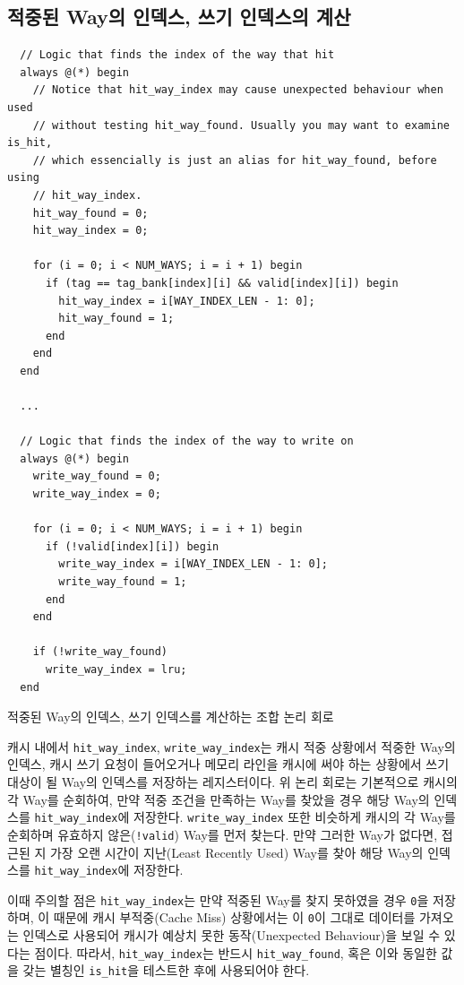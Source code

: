 \documentclass[openright, a4paper]{article}
\newcommand{\code}[1]{\texttt{#1}}
\newenvironment{longlisting}{\captionsetup{type=listing}}{}
\begin{document}
\subsection{적중된 Way의 인덱스, 쓰기 인덱스의 계산}

\hfill

\begin{longlisting}
    \begin{verbatim}
  // Logic that finds the index of the way that hit
  always @(*) begin
    // Notice that hit_way_index may cause unexpected behaviour when used
    // without testing hit_way_found. Usually you may want to examine is_hit,
    // which essencially is just an alias for hit_way_found, before using
    // hit_way_index.
    hit_way_found = 0;
    hit_way_index = 0;

    for (i = 0; i < NUM_WAYS; i = i + 1) begin
      if (tag == tag_bank[index][i] && valid[index][i]) begin
        hit_way_index = i[WAY_INDEX_LEN - 1: 0]; 
        hit_way_found = 1;
      end   
    end
  end
  
  ...

  // Logic that finds the index of the way to write on
  always @(*) begin
    write_way_found = 0;
    write_way_index = 0;

    for (i = 0; i < NUM_WAYS; i = i + 1) begin
      if (!valid[index][i]) begin
        write_way_index = i[WAY_INDEX_LEN - 1: 0];
        write_way_found = 1;
      end
    end

    if (!write_way_found)
      write_way_index = lru;
  end
    \end{verbatim}
    \caption{적중된 Way의 인덱스, 쓰기 인덱스를 계산하는 조합 논리 회로}
\end{longlisting}

\hfill

캐시 내에서 \code{hit_way_index}, \code{write_way_index}는 캐시 적중 상황에서
적중한 Way의 인덱스, 캐시 쓰기 요청이 들어오거나 메모리 라인을 캐시에 써야 하는
상황에서 쓰기 대상이 될 Way의 인덱스를 저장하는 레지스터이다. 위 논리 회로는 
기본적으로 캐시의 각 Way를 순회하여, 만약 적중 조건을 만족하는 Way를 찾았을 경우
해당 Way의 인덱스를 \code{hit_way_index}에 저장한다. \code{write_way_index} 또한
비슷하게 캐시의 각 Way를 순회하며 유효하지 않은(\code{!valid}) Way를 먼저 찾는다.
만약 그러한 Way가 없다면, 접근된 지 가장 오랜 시간이 지난(Least Recently Used) 
Way를 찾아 해당 Way의 인덱스를 \code{hit_way_index}에 저장한다.

이때 주의할 점은 \code{hit_way_index}는 만약 적중된 Way를 찾지 못하였을 경우
\code{0}을 저장하며, 이 때문에 캐시 부적중(Cache Miss) 상황에서는 이 \code{0}이
그대로 데이터를 가져오는 인덱스로 사용되어 캐시가 예상치 못한 동작(Unexpected
Behaviour)을 보일 수 있다는 점이다. 따라서, \code{hit_way_index}는 반드시 
\code{hit_way_found}, 혹은 이와 동일한 값을 갖는 별칭인 \code{is_hit}을 테스트한
후에 사용되어야 한다.
\end{document}
